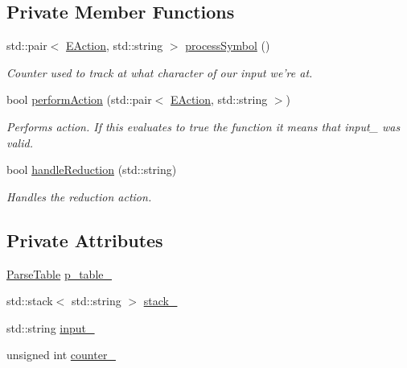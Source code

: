\subsection*{\-Private \-Member \-Functions}
\begin{DoxyCompactItemize}
\item 
std\-::pair$<$ \hyperlink{ParseTable_8h_a81d4868b129e5f45325894085a36a8a5}{\-E\-Action}, std\-::string $>$ \hyperlink{classLRParser_a3bd6bff5276c4ee9b592a14e31e789b3}{process\-Symbol} ()
\begin{DoxyCompactList}\small\item\em \-Counter used to track at what character of our input we're at. \end{DoxyCompactList}\item 
bool \hyperlink{classLRParser_aa2a11e0af8cbc1bb23b522f1a2ca87e5}{perform\-Action} (std\-::pair$<$ \hyperlink{ParseTable_8h_a81d4868b129e5f45325894085a36a8a5}{\-E\-Action}, std\-::string $>$)
\begin{DoxyCompactList}\small\item\em \-Performs action. \-If this evaluates to true the function it means that input\-\_\- was valid. \end{DoxyCompactList}\item 
bool \hyperlink{classLRParser_ab355d762edcb2c7da1f30728d08b43a1}{handle\-Reduction} (std\-::string)
\begin{DoxyCompactList}\small\item\em \-Handles the reduction action. \end{DoxyCompactList}\end{DoxyCompactItemize}
\subsection*{\-Private \-Attributes}
\begin{DoxyCompactItemize}
\item 
\hyperlink{classParseTable}{\-Parse\-Table} \hyperlink{classLRParser_a111f4dd04eb42896c7c31bd1a255a58b}{p\-\_\-table\-\_\-}
\item 
std\-::stack$<$ std\-::string $>$ \hyperlink{classLRParser_a98af41152079cb4f2fe7f280629cf18c}{stack\-\_\-}
\item 
std\-::string \hyperlink{classLRParser_a8dc38b1c7c3a3aa80abbd48ee2364319}{input\-\_\-}
\item 
unsigned int \hyperlink{classLRParser_acd3eab842429e90bd7dc0433274e0a37}{counter\-\_\-}
\end{DoxyCompactItemize}
